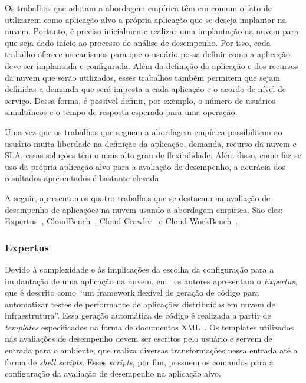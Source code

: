Os trabalhos que adotam a abordagem empírica têm em comum o fato de utilizarem como aplicação alvo a própria aplicação que se deseja implantar na nuvem. Portanto, é preciso inicialmente realizar uma implantação na nuvem para que seja dado início ao processo de análise de desempenho. Por isso, cada trabalho oferece mecanismos para que o usuário possa definir como a aplicação deve ser implantada e configurada. Além da definição da aplicação e dos recursos da nuvem que serão utilizados, esses trabalhos também permitem que sejam definidas a demanda que será imposta a cada aplicação e o acordo de nível de serviço. Dessa forma, é possível definir, por exemplo, o número de usuários simultâneos e o tempo de resposta esperado para uma operação.

Uma vez que os trabalhos que seguem a abordagem empírica possibilitam ao usuário muita liberdade na definição da aplicação, demanda, recurso da nuvem e SLA, essas soluções têm o mais alto grau de flexibilidade. Além disso, como faz-se uso da própria aplicação alvo para a avaliação de desempenho, a acurácia dos resultados apresentados é bastante elevada. 

A seguir, apresentamos quatro trabalhos que se destacam na avaliação de desempenho de aplicações na nuvem usando a abordagem empírica. São eles: Expertus~\cite{jayasinghe2012}, CloudBench~\cite{silva2013cloudbench}, Cloud Crawler~\cite{cunhacloud,cunha2013b} e Cloud WorkBench~\cite{scheuner2014cloud}.

\subsubsection{Expertus}
Devido à complexidade e às implicações da escolha da configuração para a implantação de uma aplicação na nuvem, em~\cite{jayasinghe2012} os autores apresentam o \textit{Expertus}, que é descrito como ``um framework flexível de geração de código para automatizar testes de performance de aplicações distribuídas em nuvem de infraestrutura''. Essa geração automática de código é realizada a partir de {\em templates} especificados na forma de documentos XML~\cite{jayasinghe2012}. Os templates utilizados nas avaliações de desempenho devem ser escritos pelo usuário e servem de entrada para o ambiente, que realiza diversas transformações nessa entrada até a forma de \textit{shell scripts}. Esses \textit{scripts}, por fim, possuem os comandos para a configuração da avaliação de desempenho na aplicação alvo.

